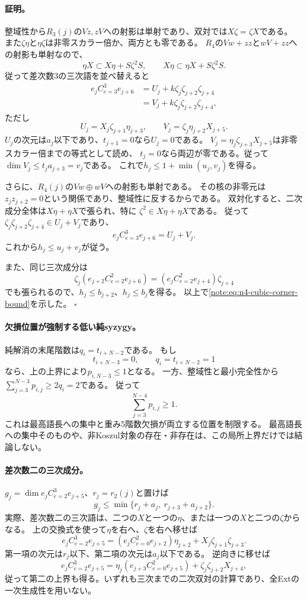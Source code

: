 \documentclass[11pt,a4paper]{ltjsarticle}
\begin{document}
\paragraph{証明。}
整域性から$R_3(j)$の$Vz,zV$への射影は単射であり、双対では$X\zeta=\zeta X$である。
また$\zeta\eta$と$\eta\zeta$は非零スカラー倍か、両方とも零である。
$R_4$の$Vw+zz$と$wV+zz$への射影も単射なので、
\[
 \eta X\subset X\eta+S\zeta^2S,\qquad
 X\eta\subset\eta X+S\zeta^2S.
\]
従って差次数3の三次語を並べ替えると
\begin{align*}
 e_jC^3_{e=3}e_{j+6}
 &=U_j+k\zeta_j\zeta_{j+2}\zeta_{j+4}\\
 &=V_j+k\zeta_j\zeta_{j+2}\zeta_{j+4},
 \end{align*}
ただし
\[
 U_j=X_j\zeta_{j+1}\eta_{j+3},\qquad
 V_j=\zeta_j\eta_{j+2}X_{j+5}.
\]
$U_j$の次元は$a_j$以下であり、$t_{j+1}=0$なら$U_j=0$である。
$V_j=\eta_j\zeta_{j+3}X_{j+5}$は非零スカラー倍までの等式として読め、
$t_j=0$なら両辺が零である。従って$\dim V_j\le t_ja_{j+3}=v_j$である。
これで$h_j\le1+\min(u_j,v_j)$を得る。

さらに、$R_4(j)$の$Vw\oplus wV$への射影も単射である。
その核の非零元は$z_jz_{j+2}=0$という関係であり、整域性に反するからである。
双対化すると、二次成分全体は$X\eta+\eta X$で張られ、特に
$\zeta^2\in X\eta+\eta X$である。
従って$\zeta_j\zeta_{j+2}\zeta_{j+4}\in U_j+V_j$であり、
\[
 e_jC^3_{e=3}e_{j+6}=U_j+V_j.
\]
これから$h_j\le u_j+v_j$が従う。

また、同じ三次成分は
\[
 \zeta_j(e_{j+2}C^2_{e=2}e_{j+6})
 =(e_jC^2_{e=2}e_{j+4})\zeta_{j+4}
\]
でも張られるので、$h_j\le b_{j+2}$、$h_j\le b_j$を得る。
以上で\eqref{note:eq:n4-cubic-corner-bound}を示した。
\hfill$\square$

\paragraph{欠損位置が強制する低い純syzygy。}
純解消の末尾階数は$q_i=t_{i+N-2}$である。
もし
\[
 t_{i+N-3}=0,\qquad q_i=t_{i+N-2}=1
\]
なら、上の上界により$p_{i,N-3}\le1$となる。
一方、整域性と最小完全性から$\sum_{j=3}^{N-3}p_{i,j}\ge2q_i=2$である。
従って
\[
 \sum_{j=3}^{N-4}p_{i,j}\ge1.
\]
これは最高語長への集中と重み5階数欠損が両立する位置を制限する。
最高語長への集中そのものや、非Koszul対象の存在・非存在は、この局所上界だけでは結論しない。

\paragraph{差次数二の三次成分。}
$g_j=\dim e_jC^3_{e=2}e_{j+5}$、$r_j=r_2(j)$と置けば
\begin{equation}\label{note:eq:n4-cubic-excess-two-bound}
 g_j\le\min\{r_j+a_j,\ r_{j+3}+a_{j+2}\}.
\end{equation}
実際、差次数二の三次語は、二つの$X$と一つの$\eta$、または一つの$X$と二つの$\zeta$からなる。
上の交換式を使って$\eta$を右へ、$\zeta$を右へ移せば
\[
 e_jC^3_{e=2}e_{j+5}
 =(e_jC^2_{e=0}e_{j+2})\eta_{j+2}
   +X_j\zeta_{j+1}\zeta_{j+3}.
\]
第一項の次元は$r_j$以下、第二項の次元は$a_j$以下である。
逆向きに移せば
\[
 e_jC^3_{e=2}e_{j+5}
 =\eta_j(e_{j+3}C^2_{e=0}e_{j+5})
  +\zeta_j\zeta_{j+2}X_{j+4},
\]
従って第二の上界も得る。いずれも三次までの二次双対の計算であり、全Extの一次生成性を用いない。
\end{document}
